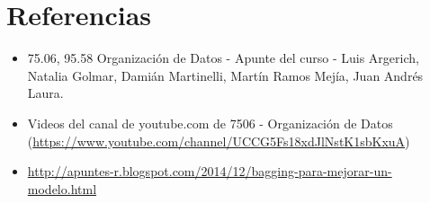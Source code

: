 \documentclass[12pt]{article}
\begin{document}
\newpage
\section{Referencias}
\begin{itemize}
  \item 75.06, 95.58 Organización de Datos - Apunte del curso - Luis Argerich, Natalia Golmar, Damián Martinelli, Martín Ramos Mejía, Juan Andrés Laura.
  \item Videos del canal de youtube.com de 7506 - Organización de Datos (\url{https://www.youtube.com/channel/UCCG5Fs18xdJlNstK1sbKxuA})
  \item \url{http://apuntes-r.blogspot.com/2014/12/bagging-para-mejorar-un-modelo.html}
\end{itemize}
\end{document}
